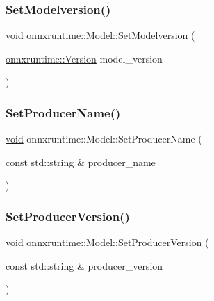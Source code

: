 \mbox{\label{classonnxruntime_1_1Model_af94a49d45c75745305a1d09e70d67f79}} 
\subsubsection{\texorpdfstring{Set\+Modelversion()}{SetModelversion()}}
{\footnotesize\ttfamily \mbox{\hyperlink{mlasi_8h_a88f941d423cb2a819b70a1358982b1a6}{void}} onnxruntime\+::\+Model\+::\+Set\+Modelversion (\begin{DoxyParamCaption}\item[{\mbox{\hyperlink{namespaceonnxruntime_ab7fae8d5830807c074def3bb8ae23cf1}{onnxruntime\+::\+Version}}}]{model\+\_\+version }\end{DoxyParamCaption})}

\mbox{\label{classonnxruntime_1_1Model_a1a2ef48c73944b335843d29214809f2a}} 
\subsubsection{\texorpdfstring{Set\+Producer\+Name()}{SetProducerName()}}
{\footnotesize\ttfamily \mbox{\hyperlink{mlasi_8h_a88f941d423cb2a819b70a1358982b1a6}{void}} onnxruntime\+::\+Model\+::\+Set\+Producer\+Name (\begin{DoxyParamCaption}\item[{const std\+::string \&}]{producer\+\_\+name }\end{DoxyParamCaption})}

\mbox{\label{classonnxruntime_1_1Model_a5c4641b87c9285462d89a04e28e0824d}} 
\subsubsection{\texorpdfstring{Set\+Producer\+Version()}{SetProducerVersion()}}
{\footnotesize\ttfamily \mbox{\hyperlink{mlasi_8h_a88f941d423cb2a819b70a1358982b1a6}{void}} onnxruntime\+::\+Model\+::\+Set\+Producer\+Version (\begin{DoxyParamCaption}\item[{const std\+::string \&}]{producer\+\_\+version }\end{DoxyParamCaption})}

